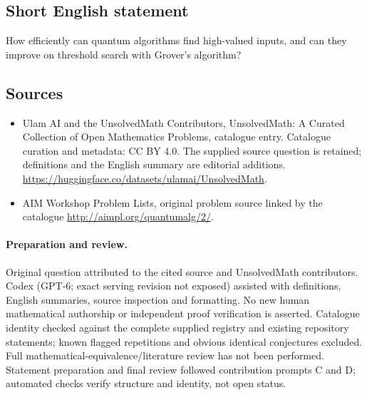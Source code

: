 \documentclass[11pt]{article}
\begin{document}
\subsection{Short English statement}
How efficiently can quantum algorithms find high-valued inputs, and can they improve on threshold search with Grover's algorithm?
\subsection{Sources}
\begin{itemize}
\item[\hypertarget{source:statement:1}{S1}] Ulam AI and the UnsolvedMath Contributors, UnsolvedMath: A Curated Collection of Open Mathematics Problems, catalogue entry. Catalogue curation and metadata: CC BY 4.0. The supplied source question is retained; definitions and the English summary are editorial additions.
\url{https://huggingface.co/datasets/ulamai/UnsolvedMath}.
\item[\hypertarget{source:statement:2}{S2}] AIM Workshop Problem Lists, original problem source linked by the catalogue
\url{http://aimpl.org/quantumalg/2/}.
\end{itemize}
\paragraph{Preparation and review.}
Original question attributed to the cited source and UnsolvedMath contributors. Codex (GPT-6; exact serving revision not exposed) assisted with definitions, English summaries, source inspection and formatting. No new human mathematical authorship or independent proof verification is asserted. Catalogue identity checked against the complete supplied registry and existing repository statements; known flagged repetitions and obvious identical conjectures excluded. Full mathematical-equivalence/literature review has not been performed. Statement preparation and final review followed contribution prompts C and D; automated checks verify structure and identity, not open status.
\label{end:statement}
\end{document}
